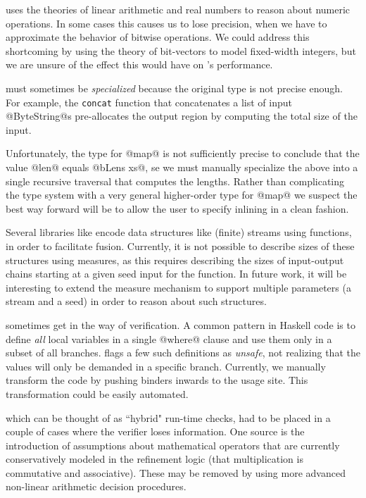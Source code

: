 \toolname uses the theories of linear arithmetic and
real numbers to reason about numeric operations. In some
cases this causes us to lose precision, \eg when we have to
approximate the behavior of bitwise operations. We could
address this shortcoming by using the theory of bit-vectors
to model fixed-width integers, but we are unsure of the
effect this would have on \toolname's performance.

must sometimes be \emph{specialized} because the 
original type is not precise enough. 
%
For example, the \texttt{concat} function that
concatenates a list of input @ByteString@s %
pre-allocates the output region by computing the 
total size of the input.
%
Unfortunately, the type for @map@ is not sufficiently
precise to conclude that the value @len@ equals 
@bLens xs@, se we must manually specialize
the above into a single recursive traversal that 
computes the lengths.
%
Rather than complicating the type system with a very
general higher-order type for @map@ we suspect the 
best way forward will be to allow the user to specify
inlining in a clean fashion.

 Several libraries like \lbtext
encode data structures like (finite) streams using functions,
in order to facilitate fusion. Currently, it is not possible
to describe sizes of these structures using measures, as this
requires describing the sizes of input-output chains starting
at a given seed input for the function. In future work, it will 
be interesting to extend the measure mechanism to support 
multiple parameters (\eg a stream and a seed) in order to reason
about such structures. 

 sometimes get in the way of verification. 
A common pattern in Haskell code is to define \emph{all} 
local variables in a single @where@ clause and use them 
only in a subset of all branches. 
%
\toolname flags a few such definitions as \emph{unsafe},
not realizing that the values will only be demanded in a
specific branch. 
%
Currently, we manually transform the code by pushing 
binders inwards to the usage site. %
This transformation could be easily automated.

which can be thought of as ``hybrid" run-time checks,
had to be placed in a couple of cases where the verifier 
loses information. 
%
One source is the introduction of assumptions about
mathematical operators that are currently conservatively 
modeled in the refinement logic (\eg that multiplication 
is commutative and associative). 
These may be removed by using more advanced non-linear 
arithmetic decision procedures.

